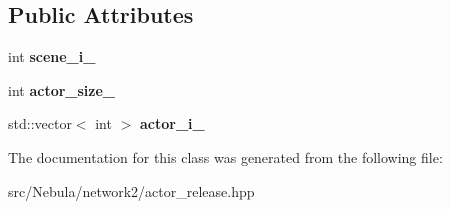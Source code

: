 \subsection*{\-Public \-Attributes}
\begin{DoxyCompactItemize}
\item 
\hypertarget{classneb_1_1packet_1_1actor__release_a93c67e65fd2391fa5788ea4df62dea83}{int {\bfseries scene\-\_\-i\-\_\-}}\label{classneb_1_1packet_1_1actor__release_a93c67e65fd2391fa5788ea4df62dea83}

\item 
\hypertarget{classneb_1_1packet_1_1actor__release_adb41a9a1ca585fc92c5811a086088fba}{int {\bfseries actor\-\_\-size\-\_\-}}\label{classneb_1_1packet_1_1actor__release_adb41a9a1ca585fc92c5811a086088fba}

\item 
\hypertarget{classneb_1_1packet_1_1actor__release_a38a61811df9631de91ded02972d2e23b}{std\-::vector$<$ int $>$ {\bfseries actor\-\_\-i\-\_\-}}\label{classneb_1_1packet_1_1actor__release_a38a61811df9631de91ded02972d2e23b}

\end{DoxyCompactItemize}


\-The documentation for this class was generated from the following file\-:\begin{DoxyCompactItemize}
\item 
src/\-Nebula/network2/actor\-\_\-release.\-hpp\end{DoxyCompactItemize}
